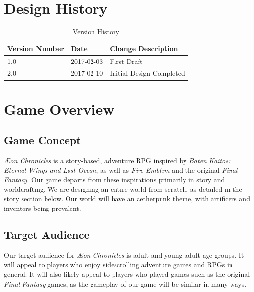 \documentclass[12pt,titlepage]{article}
\title{\gametitle}
\subtitle{SUBTITLE?}
\author{Team Epsilon}
\date{\today}
\newcommand\gametitle{\textit{\AE on Chronicles}\xspace}
\begin{document}
\maketitle

\tableofcontents
\newpage
\listoffigures
\newpage
\listoftables


\newpage
\section{Design History}
\begin{table}[H]
    \caption{Version History}
    \label{tbl:version_history}
    \centering
    \begin{tabularx}{\linewidth}{| l | l || X |}
        \hline
        \textbf{Version Number} & \textbf{Date} & \textbf{Change Description} \\
        \hline\hline
        1.0 & 2017-02-03 & First Draft \\
        \hline
        2.0 & 2017-02-10 & Initial Design Completed \\
        \hline
    \end{tabularx}
\end{table}

\newpage
\section{Game Overview}
\subsection{Game Concept}
\gametitle is a story-based, adventure RPG inspired by \textit{Baten Kaitos:
Eternal Wings and Lost Ocean}, as well as \textit{Fire Emblem} and the original
\textit{Final Fantasy}. Our game departs from these inspirations primarily
in story and worldcrafting. We are designing an entire world from scratch, as
detailed in the story section below. Our world will have an aetherpunk theme,
with artificers and inventors being prevalent.

\subsection{Target Audience}
Our target audience for \gametitle is adult and young adult age groups. It will
appeal to players who enjoy sidescrolling adventure games and RPGs in general.
It will also likely appeal to players who played games such as the original
\textit{Final Fantasy} games, as the gameplay of our game will be similar in
many ways.
\end{document}
